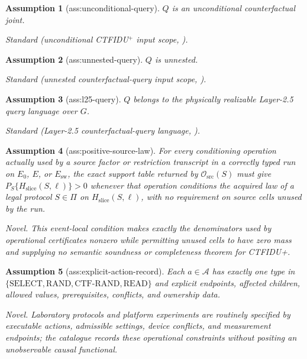 \documentclass{article}
\newtheorem{assumption}{Assumption}
\begin{document}
\begin{assumption}[ass:unconditional-query]\label{ass:unconditional-query}
\(Q\) is an unconditional counterfactual joint.
\par\smallskip\noindent\emph{Standard} (unconditional CTFIDU\({}^{+}\) input scope, \cite{RaghavanBareinboim2026CTFIDUPlus}).
\end{assumption}

\begin{assumption}[ass:unnested-query]\label{ass:unnested-query}
\(Q\) is unnested.
\par\smallskip\noindent\emph{Standard} (unnested counterfactual-query input scope, \cite{CorreaLeeBareinboim2021NestedCTFID}).
\end{assumption}

\begin{assumption}[ass:l25-query]\label{ass:l25-query}
\(Q\) belongs to the physically realizable Layer-2.5 query language over \(G\).
\par\smallskip\noindent\emph{Standard} (Layer-2.5 counterfactual-query language, \cite{RaghavanBareinboim2026CTFIDUPlus}).
\end{assumption}

\begin{assumption}[ass:positive-source-law]\label{ass:positive-source-law}
For every conditioning operation actually used by a source factor or restriction transcript in a correctly typed run on \(E_0\), \(E\), or \(E_{\mathrm{sw}}\), the exact support table returned by \(\mathcal O_{\mathrm{src}}(S)\) must give \(P_S\{H_{\mathrm{slice}}(S,\ell)\}>0\) whenever that operation conditions the acquired law of a legal protocol \(S\in\Pi\) on \(H_{\mathrm{slice}}(S,\ell)\), with no requirement on source cells unused by the run.
\par\smallskip\noindent\emph{Novel.} This event-local condition makes exactly the denominators used by operational certificates nonzero while permitting unused cells to have zero mass and supplying no semantic soundness or completeness theorem for CTFIDU+.
\end{assumption}

\begin{assumption}[ass:explicit-action-record]\label{ass:explicit-action-record}
Each \(a\in\mathcal A\) has exactly one type in \(\{\mathrm{SELECT},\mathrm{RAND},\mathrm{CTF\text{-}RAND},\mathrm{READ}\}\) and explicit endpoints, affected children, allowed values, prerequisites, conflicts, and ownership data.
\par\smallskip\noindent\emph{Novel.} Laboratory protocols and platform experiments are routinely specified by executable actions, admissible settings, device conflicts, and measurement endpoints; the catalogue records these operational constraints without positing an unobservable causal functional.
\end{assumption}
\end{document}
